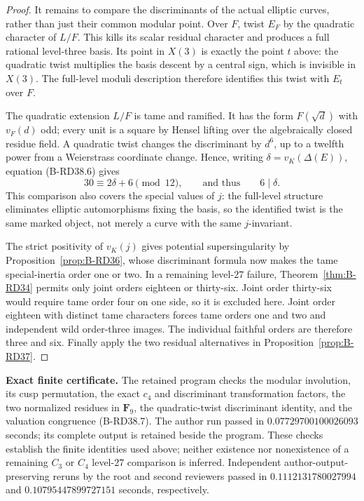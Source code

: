 \begin{proof}
It remains to compare the discriminants of the actual elliptic
curves, rather than just their common modular point. Over $F$,
twist $E_F$ by the quadratic character of $L/F$. This kills its
scalar residual character and produces a full rational level-three
basis. Its point in $X(3)$ is exactly the point $t$ above: the
quadratic twist multiplies the basis descent by a central sign,
which is invisible in $X(3)$. The full-level moduli description
therefore identifies this twist with $E_t$ over $F$.

The quadratic extension $L/F$ is tame and ramified. It has the
form $F(\sqrt d)$ with $v_F(d)$ odd; every unit is a square by
Hensel lifting over the algebraically closed residue field.
A quadratic twist changes the discriminant by $d^6$, up to a
twelfth power from a Weierstrass coordinate change. Hence, writing
$\delta=v_K(\Delta(E))$, equation (B-RD38.6) gives
\[
                   30\equiv2\delta+6\pmod {12},
       \qquad\text{and thus}\qquad 6\mid\delta.
                                                        \tag{B-RD38.7}
\]
This comparison also covers the special values of $j$: the
full-level structure eliminates elliptic automorphisms fixing the
basis, so the identified twist is the same marked object, not
merely a curve with the same $j$-invariant.

The strict positivity of $v_K(j)$ gives potential supersingularity
by Proposition~\ref{prop:B-RD36}, whose discriminant formula now
makes the tame special-inertia order one or two. In a remaining
level-$27$ failure, Theorem~\ref{thm:B-RD34} permits only joint
orders eighteen or thirty-six. Joint order thirty-six would require
tame order four on one side, so it is excluded here. Joint order
eighteen with distinct tame characters forces tame orders one and
two and independent wild order-three images. The individual
faithful orders are therefore three and six. Finally apply the two
residual alternatives in Proposition~\ref{prop:B-RD37}.
\end{proof}

\par\smallskip\noindent\textbf{Exact finite certificate.}
The retained program  checks
the modular involution, its cusp permutation, the exact $c_4$ and
discriminant transformation factors, the two normalized residues in
$\mathbf F_9$, the quadratic-twist discriminant identity, and the
valuation congruence (B-RD38.7). The author run passed in
$0.07729700100026093$ seconds; its complete output is retained
beside the program.
These checks establish the finite identities used above; neither
existence nor nonexistence of a remaining $C_3$ or $C_4$ level-$27$
comparison is inferred. Independent author-output-preserving reruns by
the root and second reviewers passed in $0.1112131780027994$ and
$0.10795447899727151$ seconds, respectively.

